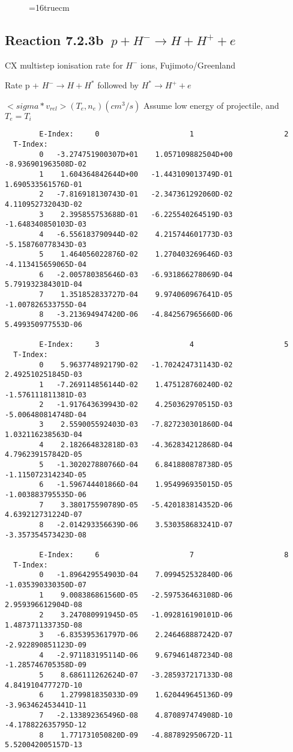 \documentclass[12pt]{article}
\begin{document}
\begin{figure} \label{7.2.3a}
\epsfxsize=16truecm
\end{figure}
\newpage

\subsection{
Reaction 7.2.3b   $\  p + H^{-} \rightarrow  H + H^+ + e$
}

  CX multistep ionisation rate for $H^-$ ions,
  Fujimoto/Greenland

  Rate p + $H^- \rightarrow H + H^*$ followed by $H^* \rightarrow H^+
+e$

$ <sigma*v_{rel}>(T_e,n_e) (cm^3/s)$
Assume low energy of projectile, and $T_e = T_i$

\begin{small}\begin{verbatim}
        E-Index:     0                     1                     2
  T-Index:
        0   -3.274751900307D+01    1.057109882504D+00   -8.936901963508D-02
        1    1.604364842644D+00   -1.443109013749D-01    1.690533561576D-01
        2   -7.816918130743D-01   -2.347361292060D-02    4.110952732043D-02
        3    2.395855753688D-01   -6.225540264519D-03   -1.648340850103D-03
        4   -6.556183790944D-02    4.215744601773D-03   -5.158760778343D-03
        5    1.464056022876D-02    1.270403269646D-03   -4.113415659065D-04
        6   -2.005780385646D-03   -6.931866278069D-04    5.791932384301D-04
        7    1.351852833727D-04    9.974060967641D-05   -1.007826533755D-04
        8   -3.213694947420D-06   -4.842567965660D-06    5.499350977553D-06

        E-Index:     3                     4                     5
  T-Index:
        0    5.963774892179D-02   -1.702424731143D-02    2.492510251845D-03
        1   -7.269114856144D-02    1.475128760240D-02   -1.576111811381D-03
        2   -1.917643639943D-02    4.250362970515D-03   -5.006480814748D-04
        3    2.559005592403D-03   -7.827230301860D-04    1.032116238563D-04
        4    2.182664832818D-03   -4.362834212868D-04    4.796239157842D-05
        5   -1.302027880766D-04    6.841880878738D-05   -1.115072314234D-05
        6   -1.596744401866D-04    1.954996935015D-05   -1.003883795535D-06
        7    3.380175590789D-05   -5.420183814352D-06    4.639212731224D-07
        8   -2.014293356639D-06    3.530358683241D-07   -3.357354573423D-08

        E-Index:     6                     7                     8
  T-Index:
        0   -1.896429554903D-04    7.099452532840D-06   -1.035390330350D-07
        1    9.008386861560D-05   -2.597536463108D-06    2.959396612904D-08
        2    3.247080991945D-05   -1.092816190101D-06    1.487371133735D-08
        3   -6.835395361797D-06    2.246468887242D-07   -2.922890851123D-09
        4   -2.971183195114D-06    9.679461487234D-08   -1.285746705358D-09
        5    8.686111262624D-07   -3.285937217133D-08    4.841910477727D-10
        6    1.279981835033D-09    1.620449645136D-09   -3.963462453441D-11
        7   -2.133892365496D-08    4.870897474908D-10   -4.178822635795D-12
        8    1.771731050820D-09   -4.887892950672D-11    5.520042005157D-13


\end{verbatim}
\end{small}
\end{document}
